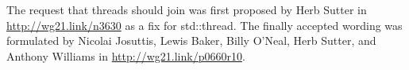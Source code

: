 

The request that threads should join was first proposed by Herb Sutter in \url{http://wg21.link/n3630} as a fix for std::thread. The finally accepted wording was formulated by Nicolai Josuttis, Lewis Baker, Billy O’Neal, Herb Sutter, and Anthony Williams in \url{http://wg21.link/p0660r10}.